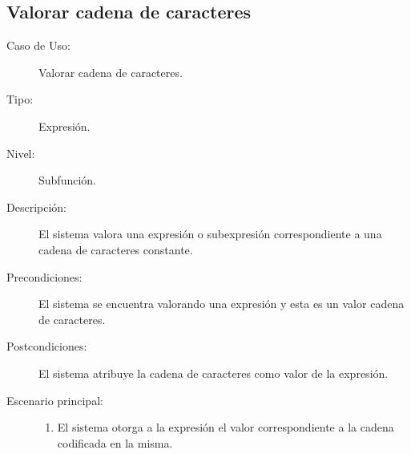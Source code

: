 \subsection {Valorar cadena de caracteres}
\begin{framed}
\FloatBarrier
\begin{description}
   \item[Caso de Uso:]  Valorar cadena de caracteres.
   \item [Tipo:] Expresión.
   \item[Nivel:]  Subfunción.
   \item[Descripción:] 
   El sistema valora una expresión o subexpresión correspondiente a
   una cadena de caracteres constante.
   \item[Precondiciones:] 
   El sistema se encuentra valorando una expresión y esta es un valor cadena de caracteres.
   \item[Postcondiciones:] 
   El sistema atribuye la cadena de caracteres como valor de la expresión.
   \item[Escenario principal:] \hfill
   \begin{enumerate}
   \item El sistema otorga a la expresión el valor correspondiente a la cadena codificada
   en la misma.
   \end{enumerate}
\end{description}
 \FloatBarrier
\end{framed}
